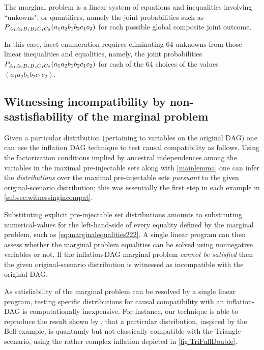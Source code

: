 The marginal problem is a linear system of equations and inequalities involving ``unkowns", or quantifiers, namely the joint probabilities such as $\p[A_1 A_2 B_1 B_2 C_1 C_2]{a_1 a_2 b_1 b_2 c_1 c_2}$ for each possible global composite joint outcome.


In this case, facet enumeration requires eliminating 64 unknowns from those linear inequalities and equalities, namely, the joint probabilities $\p[A_1 A_2 B_1 B_2 C_1 C_2]{a_1 a_2 b_1 b_2 c_1 c_2}$ for each of the 64 choices of the values $(a_1 a_2 b_1 b_2 c_1 c_2)$.

\subsection{Witnessing incompatibility by non-sastisfiability of the marginal problem}\label{sec:satisfiable}

Given a particular distribution (pertaining to variables on the original DAG) one can use the inflation DAG technique to test causal compatibility as follows. Using the factorization conditions implied by ancestral independences among the variables in the maximal pre-injectable sets along with \cref{mainlemma} one can infer the \emph{distributions} over the maximal pre-injectable sets \emph{pursuant} to the given original-scenario distribution; this was essentially the first step in each example in \cref{subsec:witnessingincompat}. 

Substituting explicit pre-injectable set distributions amounts to substituting numerical-values for the left-hand-side of every equality defined by the marginal problem, such as \cref{eq:marginalequalities222}. A single linear program can then assess whether the marginal problem equalities can be solved using nonnegative variables or not. If the inflation-DAG marginal problem \emph{cannot be satisfied} then the given original-scenario distribution is witnessed as incompatible with the original DAG.

As satisfiability of the marginal problem can be resolved by a single linear program, testing specific distributions for causal compatibility with an inflation-DAG is computationally inexpensive. For instance, our technique is able to reproduce the result shown by \citet[Theorem~2.16]{fritz2012bell}, that a particular distribution, inspired by the Bell example, is quantumly but not classically compatible with the Triangle scenario, using the rather complex inflation depicted in \cref{fig:TriFullDouble}. 


